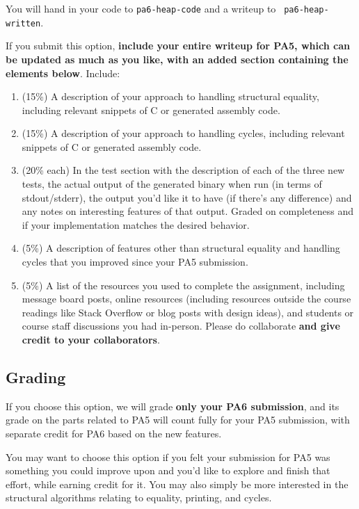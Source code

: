 \documentclass[10pt, oneside]{article}
\begin{document}
You will hand in your code to {\tt pa6-heap-code} and a writeup to {\tt
pa6-heap-written}.

If you submit this option, {\bf include your entire writeup for PA5, which
can be updated as much as you like, with an added section containing the
elements below}. Include:

\begin{enumerate}

\item (15\%) A description of your approach to handling structural equality,
including relevant snippets of C or generated assembly code.

\item (15\%) A description of your approach to handling cycles, including relevant
snippets of C or generated assembly code.

\item (20\% each) In the test section with the description of each of the
three new tests, the actual output of the generated binary when run (in terms
of stdout/stderr), the output you’d like it to have (if there’s any
difference) and any notes on interesting features of that output. Graded on
completeness and if your implementation matches the desired behavior.

\item (5\%) A description of features other than structural equality and
handling cycles that you improved since your PA5 submission.

\item (5\%) A list of the resources you used to complete the assignment,
including message board posts, online resources (including resources
outside the course readings like Stack Overflow or blog posts with design
ideas), and students or course staff discussions you had in-person. Please
do collaborate {\bf and give credit to your collaborators}.

\end{enumerate}



\subsection*{Grading}

If you choose this option, we will grade {\bf only your PA6 submission}, and
its grade on the parts related to PA5 will count fully for your PA5
submission, with separate credit for PA6 based on the new features.

You may want to choose this option if you felt your submission for PA5 was
something you could improve upon and you'd like to explore and finish that
effort, while earning credit for it. You may also simply be more
interested in the structural algorithms relating to equality, printing, and
cycles.
\end{document}
